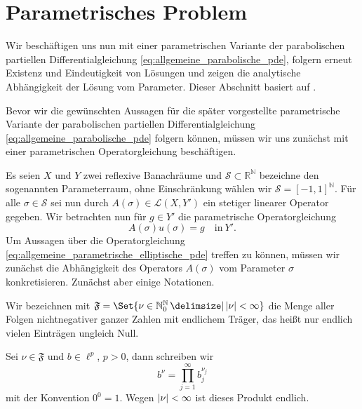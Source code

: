 \section{Parametrisches Problem} %
\label{sec:parametrisches_problem}

Wir beschäftigen uns nun mit einer parametrischen Variante der parabolischen partiellen Differentialgleichung \eqref{eq:allgemeine_parabolische_pde}, folgern erneut Existenz und Eindeutigkeit von Lösungen und zeigen die analytische Abhängigkeit der Lösung vom Parameter.
Dieser Abschnitt basiert auf \cite{Kunoth:2013ef}.

Bevor wir die gewünschten Aussagen für die später vorgestellte parametrische Variante der parabolischen partiellen Differentialgleichung \eqref{eq:allgemeine_parabolische_pde} folgern können, müssen wir uns zunächst mit einer parametrischen Operatorgleichung beschäftigen.

Es seien $X$ und $Y$ zwei reflexive Banachräume und $\mathcal S \subset \mathbb{R}^{\mathbb{N}}$ bezeichne den sogenannten Parameterraum, ohne Einschränkung wählen wir $\mathcal S = [-1, 1]^{\mathbb{N}}$.
Für alle $\sigma \in \mathcal S$ sei nun durch $A(\sigma) \in \mathcal L(X, Y')$ ein stetiger linearer Operator gegeben.
Wir betrachten nun für $g \in Y'$ die parametrische Operatorgleichung
\begin{equation}
    \label{eq:allgemeine_parametrische_elliptische_pde}
    A(\sigma) u(\sigma) = g \quad \text{in}~Y'.
\end{equation}
Um Aussagen über die Operatorgleichung \eqref{eq:allgemeine_parametrische_elliptische_pde} treffen zu können, müssen wir zunächst die Abhängigkeit des Operators $A(\sigma)$ vom Parameter $\sigma$ konkretisieren.
Zunächst aber einige Notationen.

\begin{Bemerkung}
    Wir bezeichnen mit $\mathfrak F = \Set{ \nu \in \mathbb{N}^{\mathbb{N}}_{0} \given \abs{\nu} < \infty }$ die Menge aller Folgen nichtnegativer ganzer Zahlen mit endlichem Träger, das heißt nur endlich vielen Einträgen ungleich Null.

    Sei $\nu \in \mathfrak F$ und $b \in \ell^{p}$, $p > 0$, dann schreiben wir
    \begin{equation}
        b^{\nu} = \prod_{j = 1}^{\infty} b_{j}^{\nu_{j}}
    \end{equation}
    mit der Konvention $0^{0} = 1$.
    Wegen $\lvert\nu\rvert < \infty$ ist dieses Produkt endlich.
\end{Bemerkung}


